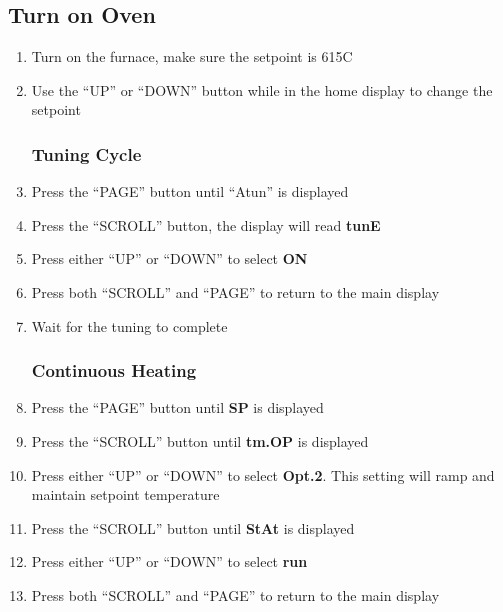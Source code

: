 \subsection{Turn on Oven}
\begin{enumerate}
\item \CheckBox[name=toov1]{} {Turn on the furnace, make sure the setpoint is 615C}
\item \CheckBox[name=toov2]{} {Use the “UP” or “DOWN” button while in the home display to change the setpoint}
\subsubsection{Tuning Cycle}
\item \CheckBox[name=toov3]{} {Press the “PAGE” button until “Atun” is displayed}
\item \CheckBox[name=toov4]{} {Press the “SCROLL” button, the display will read \textbf{tunE}}
\item \CheckBox[name=toov5]{} {Press either “UP” or “DOWN”  to select \textbf{ON}}
\item \CheckBox[name=toov6]{} {Press both “SCROLL” and “PAGE” to return to the main display }
\item \CheckBox[name=toov7]{} {Wait for the tuning to complete}
\subsubsection{Continuous Heating}
\item \CheckBox[name=toov8]{} {Press the “PAGE” button until \textbf{SP} is displayed }
\item \CheckBox[name=toov9]{} {Press the “SCROLL” button until \textbf{tm.OP} is displayed }
\item \CheckBox[name=toov10]{} {Press either “UP” or “DOWN”  to select \textbf{Opt.2}. This setting will ramp and maintain setpoint temperature}
\item \CheckBox[name=toov11]{} {Press the “SCROLL” button until \textbf{StAt} is displayed}
\item \CheckBox[name=toov12]{} {Press either “UP” or “DOWN”  to select \textbf{run} }
\item \CheckBox[name=toov13]{} {Press both “SCROLL” and “PAGE” to return to the main display  }
\end{enumerate}

